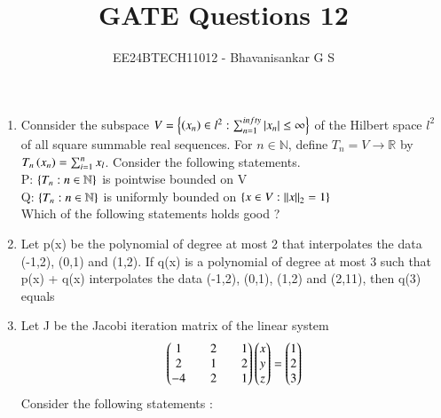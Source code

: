 \documentclass[journal]{IEEEtran}
\begin{document}

\vspace{3cm}

\title{GATE Questions 12}
\author{EE24BTECH11012 - Bhavanisankar G S}
{\let\newpage\relax\maketitle}
\begin{enumerate}
	\item Connsider the subspace $V = \left\{ \left(x_n\right) \in l^2 : \sum_{n=1}^{infty} \left\vert x_n\right\vert \leq \infty\right\}$ of the Hilbert space $l^2$ of all square summable real sequences. For $n \in \mathbb{N}$, define $T_n = V \to \mathbb{R} $ by $T_n\left(x_n\right) = \sum_{i=1}^{n} x_l $. Consider the following statements. \\
		P: $\left\{T_n : n \in \mathbb{N}\right\}$ is pointwise bounded on V \\
		Q: $\left\{T_n : n \in \mathbb{N}\right\}$ is uniformly bounded on $\left\{x \in V : \left\lVert x\right\rVert_2 = 1\right\}$ \\
	Which of the following statements holds good ?
		\begin{enumerate}
		\end{enumerate}
	\item Let p(x) be the polynomial of degree at most 2 that interpolates the data (-1,2), (0,1) and (1,2). If q(x) is a polynomial of degree at most 3 such that p(x) + q(x) interpolates the data (-1,2), (0,1), (1,2) and (2,11), then q(3) equals
	\item Let J be the Jacobi iteration matrix of the linear system 
		$$ \begin{pmatrix}1 && 2 && 1 \\ 2 && 1 && 2 \\ -4 && 2 && 1\end{pmatrix} \begin{pmatrix}x \\ y \\ z\end{pmatrix} = \begin{pmatrix}1 \\ 2 \\ 3\end{pmatrix} $$
		Consider the following statements : \\

\end{enumerate}
\end{document}

